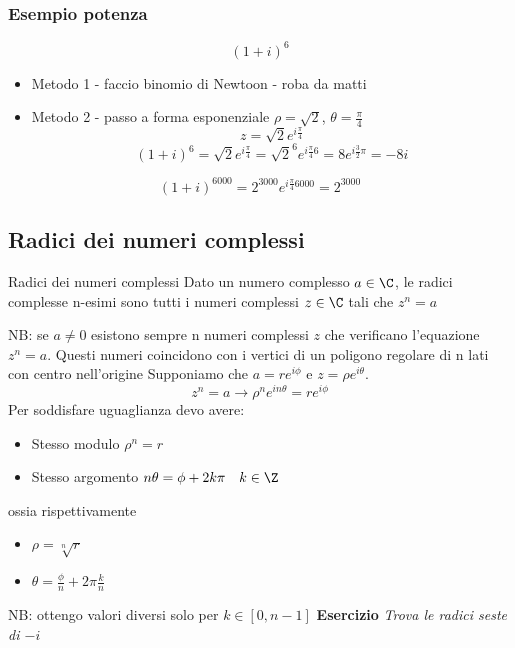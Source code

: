 \subsubsection{Esempio potenza}
\[
	\left( 1 + i  \right) ^{6}
\]
\begin{itemize}
	\item Metodo 1 - faccio binomio di Newtoon - roba da matti
	\item Metodo 2 - passo a forma esponenziale $\rho = \sqrt{2} $, $\theta = \frac{\pi}{4}$ \[
		      z = \sqrt{2} e^{i \frac{\pi}{4}}
	      \]
	      \[
		      \left( 1 + i \right) ^{ 6} = \sqrt{2} e ^{ i \frac{\pi}{4}} = \sqrt{2} ^{6} e ^{ i \frac{\pi}{4}6} = 8 e ^{i \frac{3}{2} \pi} = -8 i
	      \]
\end{itemize}
\[
	\left( 1 + i \right) ^{ 6000}= 2^{3000} e ^{i \frac{\pi}{4}6000} = 2^{3000}
\]
\subsection{Radici dei numeri complessi}

\begin{definizione}{Radici dei numeri complessi
	}
	Dato un numero complesso $a  \in  \C$, le radici complesse n-esimi sono tutti i numeri complessi $z  \in  \C$ tali che $z^{n} = a$
\end{definizione}

NB: se $ a \neq 0$ esistono sempre n numeri complessi $z$ che verificano l'equazione $ z ^{ n } = a$. Questi numeri coincidono con i vertici di un poligono regolare di n lati con centro nell'origine
\vskip3mm
Supponiamo che $a = r e ^{ i \phi}$ e $ z = \rho e ^{ i \theta}$.
\[
	z^{n} = a \rightarrow \rho^{ n} e ^{ i n \theta} = r e ^{i \phi}
\]
Per soddisfare uguaglianza devo avere:
\begin{itemize}
	\item Stesso modulo $\rho ^{n}= r$
	\item Stesso argomento $n \theta = \phi + 2k \pi \quad  k  \in  \Z$
\end{itemize}
ossia rispettivamente
\begin{itemize}
	\item $\rho = \sqrt[n]{r} $
	\item $\theta = \frac{\phi}{n} + 2 \pi \frac{k}{n}$
\end{itemize}
NB: ottengo valori diversi solo per $k  \in  \left[ 0, n-1 \right] $
\textbf{Esercizio}
\textit{Trova le radici seste di $-i$}


